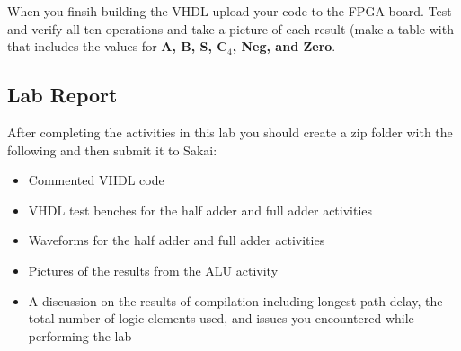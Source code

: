 When you finsih building the VHDL upload your code to the FPGA board. Test and verify all ten operations and take a picture of each result (make a table with that includes the values for {\bf A, B, S, C$_4$, Neg, and Zero}.
\subsection{Lab Report}
After completing the activities in this lab you should create a zip folder with the following and then submit it to Sakai:

\begin{itemize}
	\item Commented VHDL code
	\item VHDL test benches for the half adder and full adder activities
	\item Waveforms for the half adder and full adder activities
	\item Pictures of the results from the ALU activity 
	\item A discussion on the results of compilation including longest path delay, the total number of logic elements used, and issues you encountered while performing the lab
\end{itemize}

